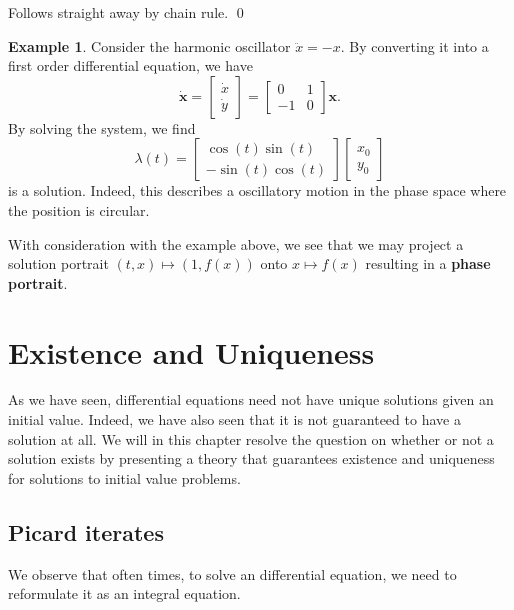 \documentclass[
]{article}
\theoremstyle{definition}
\newtheorem{example}{Example}
\theoremstyle{definition}
\begin{document}
Follows straight away by chain rule. \qed

\begin{example}
  Consider the harmonic oscillator \(\ddot x = -x\). By converting it into 
  a first order differential equation, we have 
  \[\dot{\mathbf{x}} = 
  \begin{bmatrix}
    \dot x\\ \dot y
  \end{bmatrix} = 
  \begin{bmatrix}
    0 & 1 \\
    -1 & 0
  \end{bmatrix}\mathbf{x}.\]
  By solving the system, we find 
  \[\lambda(t) = \begin{bmatrix}
    \cos(t)\sin(t)\\ -\sin(t)\cos(t)
  \end{bmatrix}
  \begin{bmatrix}
    x_0\\ y_0
  \end{bmatrix}\]
  is a solution. Indeed, this describes a oscillatory motion in the phase space 
  where the position is circular.
\end{example}

With consideration with the example above, we see that we may project a
solution portrait \((t, x) \mapsto (1, f(x))\) onto \(x \mapsto f(x)\)
resulting in a \textbf{phase portrait}.

\hypertarget{existence-and-uniqueness}{%
\section{Existence and Uniqueness}\label{existence-and-uniqueness}}

As we have seen, differential equations need not have unique solutions
given an initial value. Indeed, we have also seen that it is not
guaranteed to have a solution at all. We will in this chapter resolve
the question on whether or not a solution exists by presenting a theory
that guarantees existence and uniqueness for solutions to initial value
problems.

\hypertarget{picard-iterates}{%
\subsection{Picard iterates}\label{picard-iterates}}

We observe that often times, to solve an differential equation, we need
to reformulate it as an integral equation.
\end{document}
